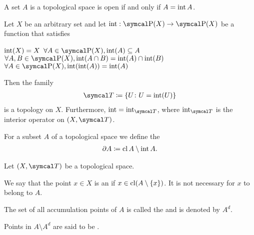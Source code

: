 \begin{proposition}\label{thm:set_open_iff_matches_interior}
  A set \( A \) is a topological space is open if and only if \( A = \operatorname{int} A \).
\end{proposition}

\begin{proposition}\label{thm:interior_operator_axioms}
  Let \( X \) be an arbitrary set and let \( \Int: \Power(X) \to \Power(X) \) be a function that satisfies
  \begin{description}
     \( \operatorname{int}(X) = X \)
     \( \forall A \in \Power(X), \Int(A) \subseteq A \)
     \( \forall A, B \in \Power(X), \Int(A \cap B) = \Int(A) \cap \Int(B) \)
     \( \forall A \in \Power(X), \Int(\Int(A)) = \Int(A) \)
  \end{description}

  Then the family
  \begin{align*}
    \Cal{T} \coloneqq \{ U \colon U = \Int(U) \}
  \end{align*}
  is a topology on \( X \). Furthermore, \( \Int = \Int_{\Cal{T}} \), where \( \Int_{\Cal{T}} \) is the interior operator on \( (X, \Cal{T}) \).
\end{proposition}

\begin{definition}\label{def:topological_boundary}\cite[24]{Engelking1989}
  For a subset \( A \) of a topological space we define the 
  \begin{align*}
    \partial A \coloneqq \operatorname{cl}{A} \setminus \operatorname{int}{A}.
  \end{align*}
\end{definition}

\begin{definition}\label{def:topologically_derived_set}\cite[24]{Engelking1989}
  Let \( (X, \Cal{T}) \) be a topological space.

  \begin{defenum}
    \item\label{def:topologically_derived_set/accumulation_point} We say that the point \( x \in X \) is an  if \( x \in \operatorname{cl}(A \setminus \{ x \}) \). It is not necessary for \( x \) to belong to \( A \).

    \item\label{def:topologically_derived_set/derived_set} The set of all accumulation points of \( A \) is called the  and is denoted by \( A^d \).

    \item\label{def:topologically_derived_set/isolated_point} Points in \( A \setminus A^d \) are said to be .
  \end{defenum}
\end{definition}

